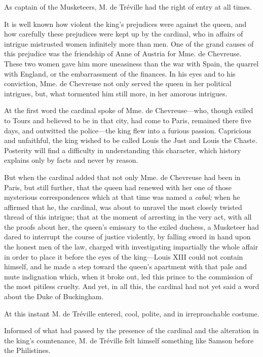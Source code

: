 As captain of the Musketeers, M. de Tréville had the right of entry at all times. 

It is well known how violent the king's prejudices were against the queen, and how carefully these prejudices were kept up by the cardinal, who in affairs of intrigue mistrusted women infinitely more than men. One of the grand causes of this prejudice was the friendship of Anne of Austria for Mme. de Chevreuse. These two women gave him more uneasiness than the war with Spain, the quarrel with England, or the embarrassment of the finances. In his eyes and to his conviction, Mme. de Chevreuse not only served the queen in her political intrigues, but, what tormented him still more, in her amorous intrigues. 

At the first word the cardinal spoke of Mme. de Chevreuse---who, though exiled to Tours and believed to be in that city, had come to Paris, remained there five days, and outwitted the police---the king flew into a furious passion. Capricious and unfaithful, the king wished to be called Louis the Just and Louis the Chaste. Posterity will find a difficulty in understanding this character, which history explains only by facts and never by reason. 

But when the cardinal added that not only Mme. de Chevreuse had been in Paris, but still further, that the queen had renewed with her one of those mysterious correspondences which at that time was named a \textit{cabal;} when he affirmed that he, the cardinal, was about to unravel the most closely twisted thread of this intrigue; that at the moment of arresting in the very act, with all the proofs about her, the queen's emissary to the exiled duchess, a Musketeer had dared to interrupt the course of justice violently, by falling sword in hand upon the honest men of the law, charged with investigating impartially the whole affair in order to place it before the eyes of the king---Louis XIII could not contain himself, and he made a step toward the queen's apartment with that pale and mute indignation which, when it broke out, led this prince to the commission of the most pitiless cruelty. And yet, in all this, the cardinal had not yet said a word about the Duke of Buckingham. 

At this instant M. de Tréville entered, cool, polite, and in irreproachable costume. 

Informed of what had passed by the presence of the cardinal and the alteration in the king's countenance, M. de Tréville felt himself something like Samson before the Philistines. 

